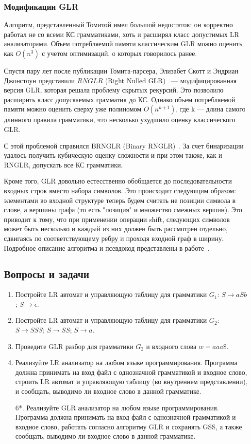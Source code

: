 \subsubsection{Модификации GLR}
Алгоритм, представленный Томитой имел большой недостаток: он корректно работал не со всеми КС грамматиками, хоть и расширял класс допустимых LR анализаторами. Объем потребляемой памяти классическим GLR можно оценить как $ O(n^3)$ с учетом оптимизаций, о которых говорилось ранее.

Спустя пару лет после публикации Томита-парсера, Элизабет Скотт и Эндриан Джонстоун представили $RNGLR$ (Right Nulled GLR)~\cite{Scott:2006:RNG:1146809.1146810} --- модифицированная версия GLR, которая решала проблему скрытых рекурсий. Это позволило расширить класс допускаемых грамматик до КС. Однако объем потребляемой памяти можно оценить сверху уже полиномом $O(n^{k+1})$, где k --- длина самого длинного правила грамматики, что несколько ухудшило оценку классического GLR.

С этой проблемой справился BRNGLR (Binary RNGLR)~\cite{Scott:2007:BCT:1289813.1289815}. За счет бинаризации удалось получить кубическую оценку сложности и при этом также, как и RNGLR, допускать все КС грамматики.

Кроме того, GLR довольно естесственно обобщается до последовательности входных $строк$ вместо набора $символов$. Это происходит следующим образом: элементами во входной структуре теперь будем считать не позиции символа в слове, а вершины графа (то есть "позиция" и множество смежных вершин). Это приводит к тому, что при применении операции shift, следующих символов может быть несколько и каждый из них должен быть рассмотрен отдельно, сдвигаясь по соответствующему ребру и проходя входной граф в ширину. Подробное описание алгоритма и псевдокод представлены в работе~\cite{10.1007/978-3-319-41579-6_22}.

\subsection{Вопросы и задачи}
\begin{enumerate}
	\item Постройте LR автомат и управляющую таблицу для грамматики $G_1$: $S \to a S b$; $S \to \epsilon$.
	\item Постройте LR автомат и управляющую таблицу для грамматики $G_2$: $S \to S S S$; $S \to S S$; $S \to a$.
	\item Проведите GLR разбор для грамматики $G_2$ и входного слова $w = aaa\$$.
	\item Реализуйте LR анализатор на любом языке программирования. Программа должна принимать на вход файл с однозначной грамматикой и входное слово, строить LR автомат и управляющую таблицу (во внутреннем представлении), и сообщать, выводимо ли входное слово в данной грамматике.
	\item[6*.] Реализуйте GLR анализатор на любом языке программирования. Программа должна принимать на вход файл с однозначной грамматикой и входное слово, работать согласно алгоритму GLR и сохранять GSS, а также сообщать, выводимо ли входное слово в данной грамматике.
\end{enumerate}
